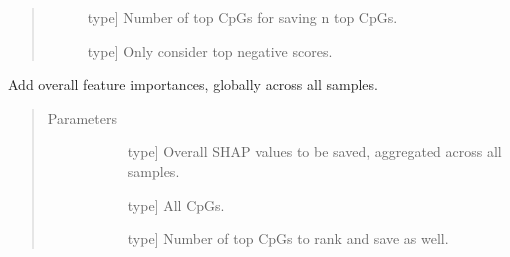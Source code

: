 \documentclass[letterpaper,10pt,english]{sphinxmanual}
\begin{document}
\begin{fulllineitems}
\begin{fulllineitems}
\begin{quote}
\begin{description}
\begin{description}
\item[{}] \leavevmode{[}type{]}
Number of top CpGs for saving n top CpGs.

\item[{}] \leavevmode{[}type{]}
Only consider top negative scores.

\end{description}

\end{description}\end{quote}

\end{fulllineitems}


\begin{fulllineitems}
\label{\detokenize{index:methylnet.interpretation_classes.ShapleyData.add_global_importance}}
Add overall feature importances, globally across all samples.
\begin{quote}\begin{description}
\item[{Parameters}] \leavevmode\begin{description}
\item[{}] \leavevmode{[}type{]}
Overall SHAP values to be saved, aggregated across all samples.

\item[{}] \leavevmode{[}type{]}
All CpGs.

\item[{}] \leavevmode{[}type{]}
Number of top CpGs to rank and save as well.

\end{description}

\end{description}\end{quote}

\end{fulllineitems}



\end{fulllineitems}
\end{document}
